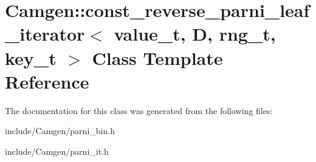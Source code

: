 \hypertarget{a00105}{\section{Camgen\-:\-:const\-\_\-reverse\-\_\-parni\-\_\-leaf\-\_\-iterator$<$ value\-\_\-t, D, rng\-\_\-t, key\-\_\-t $>$ Class Template Reference}
\label{a00105}
}


The documentation for this class was generated from the following files\-:\begin{DoxyCompactItemize}
\item 
include/\-Camgen/parni\-\_\-bin.\-h\item 
include/\-Camgen/parni\-\_\-it.\-h\end{DoxyCompactItemize}
